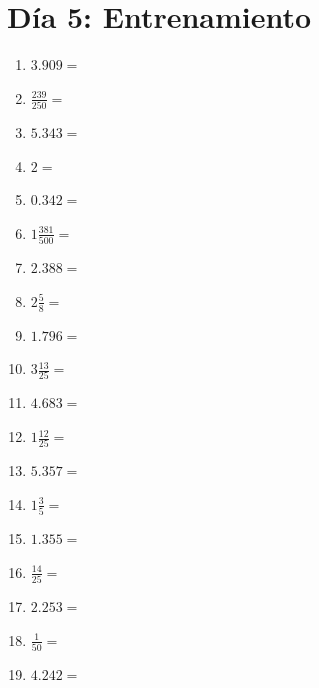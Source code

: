 \documentclass[12pt]{article}
\begin{document}
\section*{Día 5: Entrenamiento}
\begin{enumerate}
\item \large $ 3.909 = $ \vspace{1.5cm}
\item \large $ \frac{239}{250} = $ \vspace{1.5cm}
\item \large $ 5.343 = $ \vspace{1.5cm}
\item \large $ 2 = $ \vspace{1.5cm}
\item \large $ 0.342 = $ \vspace{1.5cm}
\item \large $ 1 \frac{381}{500} = $ \vspace{1.5cm}
\item \large $ 2.388 = $ \vspace{1.5cm}
\item \large $ 2 \frac{5}{8} = $ \vspace{1.5cm}
\item \large $ 1.796 = $ \vspace{1.5cm}
\item \large $ 3 \frac{13}{25} = $ \vspace{1.5cm}
\newpage
\item \large $ 4.683 = $ \vspace{1.5cm}
\item \large $ 1 \frac{12}{25} = $ \vspace{1.5cm}
\item \large $ 5.357 = $ \vspace{1.5cm}
\item \large $ 1 \frac{3}{5} = $ \vspace{1.5cm}
\item \large $ 1.355 = $ \vspace{1.5cm}
\item \large $ \frac{14}{25} = $ \vspace{1.5cm}
\item \large $ 2.253 = $ \vspace{1.5cm}
\item \large $ \frac{1}{50} = $ \vspace{1.5cm}
\item \large $ 4.242 = $ \vspace{1.5cm}

\end{enumerate}
\end{document}
